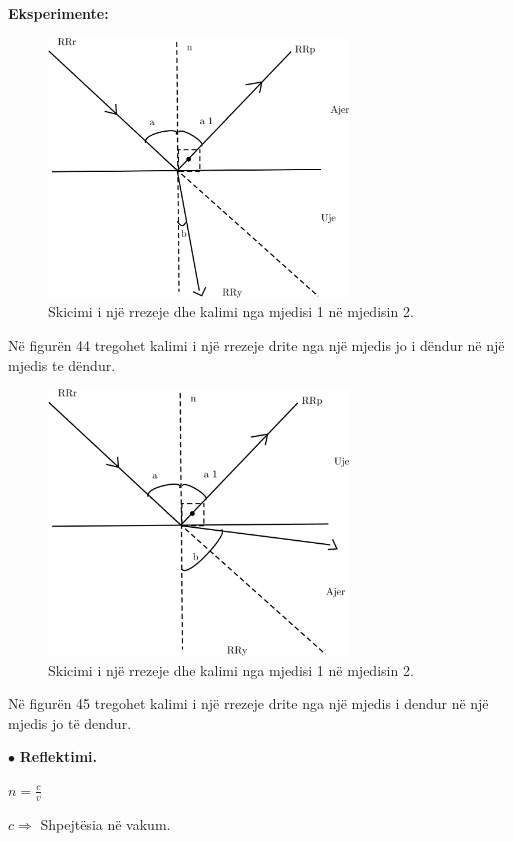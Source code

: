 \documentclass[twocolumn]{article}
\begin{document}
\begin{center}
	\textbf{Eksperimente:}
\end{center}

	\begin{figure}[h]
	\includegraphics[width=80mm]{Imazhet/ajer uje.png}
	\caption{Skicimi i një rrezeje dhe kalimi nga mjedisi 1 në mjedisin 2.}
	\label{fig:boat1}
\end{figure}

Në figurën 44 tregohet kalimi i një rrezeje drite nga një mjedis jo i dëndur në një mjedis te dëndur.

	\begin{figure}[h]
	\includegraphics[width=80mm]{Imazhet/uje ajer.png}
	\caption{Skicimi i një rrezeje dhe kalimi nga mjedisi 1 në mjedisin 2.}
	\label{fig:boat1}
\end{figure}

Në figurën 45 tregohet kalimi i një rrezeje drite nga një mjedis i dendur në një mjedis jo të dendur.

$\bullet$ \textbf{Reflektimi.}

$n=\frac{c}{v}$

$c \Rightarrow$ Shpejtësia në vakum.
\end{document}
